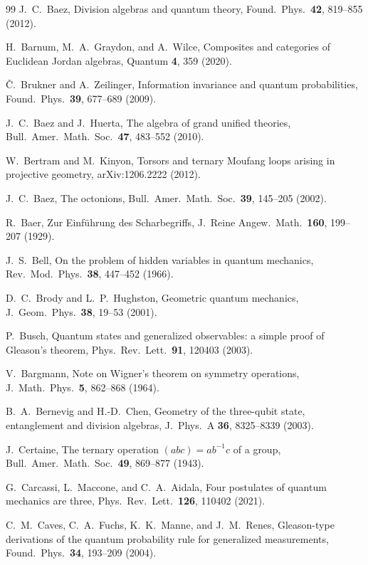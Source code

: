 \documentclass[aps,pra,onecolumn,superscriptaddress,nofootinbib,10pt]{revtex4-2}
\theoremstyle{definition}
\theoremstyle{remark}
\begin{document}
\begin{thebibliography}{99}
 J.~C.~Baez, Division algebras and quantum theory, Found.\ Phys.\ \textbf{42}, 819--855 (2012).

 H.~Barnum, M.~A.~Graydon, and A.~Wilce, Composites and categories of Euclidean Jordan algebras, Quantum \textbf{4}, 359 (2020).

 \v{C}.~Brukner and A.~Zeilinger, Information invariance and quantum probabilities, Found.\ Phys.\ \textbf{39}, 677--689 (2009).

 J.~C.~Baez and J.~Huerta, The algebra of grand unified theories, Bull.\ Amer.\ Math.\ Soc.\ \textbf{47}, 483--552 (2010).

 W.~Bertram and M.~Kinyon, Torsors and ternary Moufang loops arising in projective geometry, arXiv:1206.2222 (2012).

 J.~C.~Baez, The octonions, Bull.\ Amer.\ Math.\ Soc.\ \textbf{39}, 145--205 (2002).

 R.~Baer, Zur Einf\"uhrung des Scharbegriffs, J.\ Reine Angew.\ Math.\ \textbf{160}, 199--207 (1929).

 J.~S.~Bell, On the problem of hidden variables in quantum mechanics, Rev.\ Mod.\ Phys.\ \textbf{38}, 447--452 (1966).

 D.~C.~Brody and L.~P.~Hughston, Geometric quantum mechanics, J.\ Geom.\ Phys.\ \textbf{38}, 19--53 (2001).

 P.~Busch, Quantum states and generalized observables: a simple proof of Gleason's theorem, Phys.\ Rev.\ Lett.\ \textbf{91}, 120403 (2003).

 V.~Bargmann, Note on Wigner's theorem on symmetry operations, J.\ Math.\ Phys.\ \textbf{5}, 862--868 (1964).

 B.~A.~Bernevig and H.-D.~Chen, Geometry of the three-qubit state, entanglement and division algebras, J.\ Phys.\ A \textbf{36}, 8325--8339 (2003).

 J.~Certaine, The ternary operation $(abc)=ab^{-1}c$ of a group, Bull.\ Amer.\ Math.\ Soc.\ \textbf{49}, 869--877 (1943).

 G.~Carcassi, L.~Maccone, and C.~A.~Aidala, Four postulates of quantum mechanics are three, Phys.\ Rev.\ Lett.\ \textbf{126}, 110402 (2021).

 C.~M.~Caves, C.~A.~Fuchs, K.~K.~Manne, and J.~M.~Renes, Gleason-type derivations of the quantum probability rule for generalized measurements, Found.\ Phys.\ \textbf{34}, 193--209 (2004).


\end{thebibliography}
\end{document}
